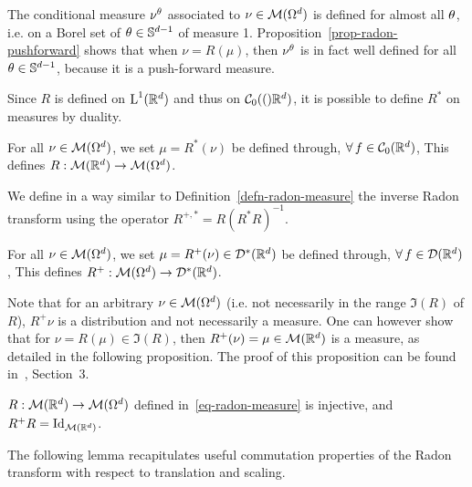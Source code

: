 The conditional measure $\nu^\theta$ associated to $\nu \in \mathcal{M}(\Omega^d)$ is defined for almost all $\theta$, i.e. on a Borel set of $\theta \in \mathbb{S}^{d-1}$ of measure 1. Proposition~\ref{prop-radon-pushforward} shows that when $\nu=R(\mu)$, then $\nu^\theta$ is in fact well defined for all $\theta \in \mathbb{S}^{d-1}$, because it is a push-forward measure. 


Since $R$ is defined on $\text{\upshape L}^1(\mathbb{R}^d)$ and thus on $\mathcal{C}_0(()\mathbb{R}^d)$, it is possible to define $R^*$ on measures by duality. 

\begin{defn}\label{defn-adj-radon-measure} For all $\nu \in \mathcal{M}(\Omega^d)$, we set $\mu=R^*(\nu)$ be defined through, $\forall \, f \in \mathcal{C}_0(\mathbb{R}^d)$, 
This defines $R : \mathcal{M}(\mathbb{R}^d) \rightarrow \mathcal{M}(\Omega^d)$.
\end{defn}
\fi


We define in a way similar to Definition~\ref{defn-radon-measure} the inverse Radon transform using the operator $R^{+,*} = R (R^*R)^{-1}$.

\begin{defn} For all $\nu \in \mathcal{M}(\Omega^d)$, we set $\mu=R^+(\nu) \in \mathcal{D}^*(\mathbb{R}^d)$ be defined through, $\forall \, f \in \mathcal{D}(\mathbb{R}^d)$, 
This defines $R^+ : \mathcal{M}(\Omega^d) \rightarrow \mathcal{D}^*(\mathbb{R}^d)$. 
\end{defn}

Note that for an arbitrary $\nu \in \mathcal{M}(\Omega^d)$ (i.e. not necessarily in the range $\Im(R)$ of $R$), $R^+\nu$ is a distribution and not necessarily a measure. One can however show that for $\nu = R(\mu) \in \Im(R)$, then $R^+(\nu)=\mu \in \mathcal{M}(\mathbb{R}^d)$ is a measure, as detailed in the following proposition. The proof of this proposition can be found in~\cite{Boman-Radon}, Section~3.


\begin{prop}\label{prop-im-radon}
	$R : \mathcal{M}(\mathbb{R}^d) \rightarrow \mathcal{M}(\Omega^d)$ defined in~\eqref{eq-radon-measure} is injective, and $R^+R=\mathrm{Id}_{\mathcal{M}(\mathbb{R}^d)}$.
\end{prop}


The following lemma recapitulates useful commutation properties of the Radon transform with respect to translation and scaling.

